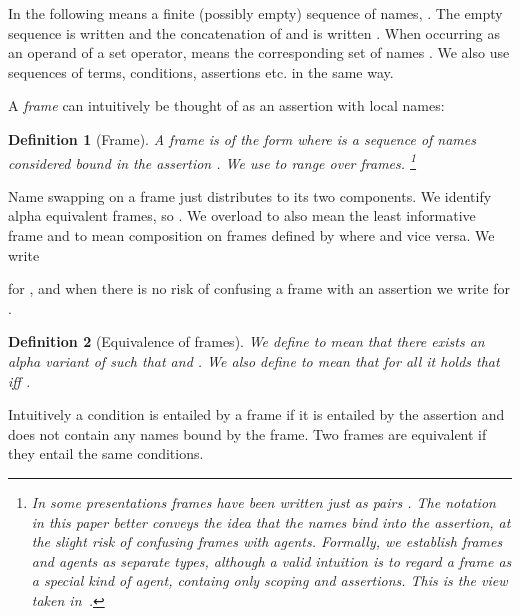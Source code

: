 \documentclass{eptcs}
\newtheorem{definition}{Definition}
\theoremstyle{definition}
\begin{document}
In the following  means a finite (possibly empty) sequence of names, . The empty sequence is written  and the concatenation of  and  is written .
When occurring as an operand of a set operator,  means the corresponding set of names . We also use sequences of terms, conditions, assertions etc. in the same way.

A {\em frame} can intuitively be thought of as an assertion with local names:
\begin{definition}[Frame]
\label{def:frame}
A {\em frame}  is of the form  where
 is a sequence of names considered bound in
the assertion 
. We use  to range over frames. \footnote{In some presentations
frames have been written just as pairs .
The notation in this paper better conveys the idea that the names bind into the
assertion, at the slight risk of confusing frames with agents. Formally, we
establish frames and agents as separate types, although a valid intuition is to
regard a frame as a special kind of agent, containg only scoping and assertions.
This is the view taken in~\cite{abadi.fournet:mobile-values}. }

\end{definition}
Name swapping on a frame  just distributes to its two components. We
identify
alpha equivalent frames, so . 
We overload  to also mean the least informative frame
 and  to mean composition on frames
defined by  where
   and vice versa. We write

for , and when there is
no risk of confusing a frame with an assertion we write  for
.

\begin{definition}[Equivalence of frames]\label{def:frame-equivalence}
We define  to mean that there exists an alpha variant
 of  such that   and . We also define 
 to mean that for all  it holds that  iff .
\end{definition}
Intuitively a condition is entailed by a frame if it is entailed by the
assertion and does not contain any names bound by the frame. 
Two frames are equivalent if they entail the same conditions.
\end{document}
